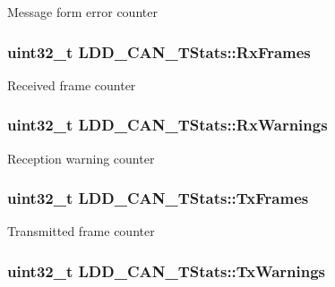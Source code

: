 Message form error counter \hypertarget{struct_l_d_d___c_a_n___t_stats_ad5fce5f144966e6ef1ebd3559573c5cc}{
\subsubsection[{Rx\-Frames}]{\setlength{\rightskip}{0pt plus 5cm}uint32\-\_\-t L\-D\-D\-\_\-\-C\-A\-N\-\_\-\-T\-Stats\-::\-Rx\-Frames}}\label{struct_l_d_d___c_a_n___t_stats_ad5fce5f144966e6ef1ebd3559573c5cc}
Received frame counter \hypertarget{struct_l_d_d___c_a_n___t_stats_a9454eaee94ea556f10485bd8608bf980}{
\subsubsection[{Rx\-Warnings}]{\setlength{\rightskip}{0pt plus 5cm}uint32\-\_\-t L\-D\-D\-\_\-\-C\-A\-N\-\_\-\-T\-Stats\-::\-Rx\-Warnings}}\label{struct_l_d_d___c_a_n___t_stats_a9454eaee94ea556f10485bd8608bf980}
Reception warning counter \hypertarget{struct_l_d_d___c_a_n___t_stats_ad6e8656da94718393be3b05ef07a5fe0}{
\subsubsection[{Tx\-Frames}]{\setlength{\rightskip}{0pt plus 5cm}uint32\-\_\-t L\-D\-D\-\_\-\-C\-A\-N\-\_\-\-T\-Stats\-::\-Tx\-Frames}}\label{struct_l_d_d___c_a_n___t_stats_ad6e8656da94718393be3b05ef07a5fe0}
Transmitted frame counter \hypertarget{struct_l_d_d___c_a_n___t_stats_a46ea9a5839da88b7e7b596ac34b72f90}{
\subsubsection[{Tx\-Warnings}]{\setlength{\rightskip}{0pt plus 5cm}uint32\-\_\-t L\-D\-D\-\_\-\-C\-A\-N\-\_\-\-T\-Stats\-::\-Tx\-Warnings}}\label{struct_l_d_d___c_a_n___t_stats_a46ea9a5839da88b7e7b596ac34b72f90}
